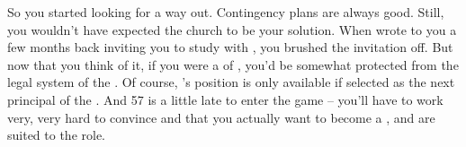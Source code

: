 \documentclass[char]{GL2020}
\begin{document}
\name{\cHeadScientist{}}


So you started looking for a way out. Contingency plans are always good. Still, you wouldn't have expected the church to be your solution. When \cBeetle{\intro} wrote to you a few months back inviting you to study with \cBeetle{\them}, you brushed the invitation off. But now that you think of it, if you were a \cHeadScientist{\intro} of \cTechGod{\intro}, you'd be somewhat protected from the legal system of the \pTech{}. Of course, \cBeetle{}'s position is only available if \cBeetle{\theyare} selected as the next principal of the \pSc{}. And 57 is a little late to enter the game -- you'll have to work very, very hard to convince \cAntiChup{\intro} and \cBeetle{} that you actually want to become a \HeadScientist{\cleric}, and are suited to the role.
\end{document}
